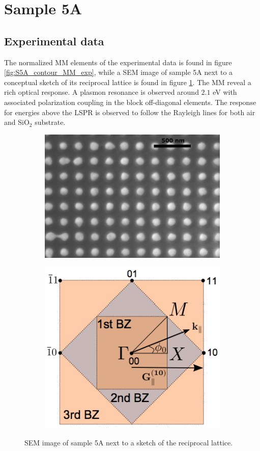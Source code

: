 \section{Sample 5A}

\subsection{Experimental data}
The normalized MM elements of the experimental data\cite{brakstad_thesis} is found in figure \ref{fig:S5A_contour_MM_exp}, while a SEM image of sample 5A next to a conceptual sketch of its reciprocal lattice is found in figure \ref{fig:S5A_SEM_reciprocallattice}. The MM reveal a rich optical response\cite{Brakstad:15}. A plasmon resonance is observed around $2.1$ eV with associated polarization coupling in the block off-diagonal elements. The response for energies above the LSPR is observed to follow the Rayleigh lines for both air and SiO$_2$ substrate.
\begin{figure}
    \begin{subfigure}{0.49\textwidth}
        \flushright
        \includegraphics[width=0.6\linewidth]{figures/Ch3/S5A_SEM.png}
    \end{subfigure}
    \begin{subfigure}{0.49\textwidth}
        \flushleft
        \includegraphics[width=0.5\linewidth]{figures/Ch2/ReciprocalLattice.png}
    \end{subfigure}
    \caption{SEM image of sample 5A next to a sketch of the reciprocal lattice.}
    \label{fig:S5A_SEM_reciprocallattice}
\end{figure}
